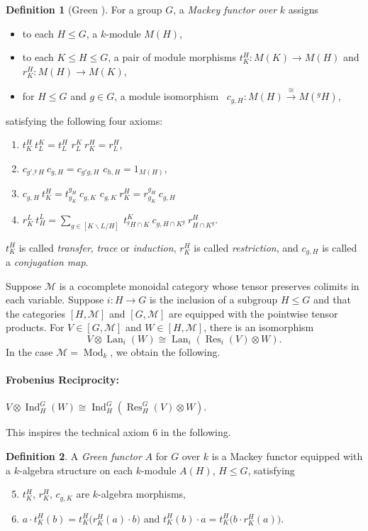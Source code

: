 \documentclass[a4paper,12pt]{article}
\theoremstyle{definition}
\newtheorem*{Definition}{Definition}%
\theoremstyle{fact}
\theoremstyle{genquest}
\theoremstyle{step}
\newcommand{\Ind}{\operatorname{Ind}}
\newcommand{\Lan}{\operatorname{Lan}}
\newcommand{\funcM}{\mathcal{M}}
\newcommand{\Mod}{\operatorname{Mod}}
\newcommand{\Res}{\operatorname{Res}}
\newcommand{\longto}{\longrightarrow}
\begin{document}
\begin{Definition}[Green \cite{Green1971}]
For a group $G$, a \emph{Mackey functor over} $k$ assigns
\begin{itemize}\addtolength{\itemsep}{-7pt}%
\item to each $H \leq G$, a $k$-module $M(H)$,
\item to each $K \leq H \leq G$, a pair of module morphisms
$
t^H_K : M(K) \to M(H)$ and $r^H_K : M(H) \to M(K)$,
%
\item 
for $H \leq G$ and $g\in G$, a module isomorphism \ 
$
c_{g,H} : M(H) \stackrel{\cong}{\longto} M (^g H)$,
%
\end{itemize}
satisfying the following four axioms: 
\begin{enumerate}[\upshape 1.]
\item
 $t^H_K \  t^K_L = t^H_L$  $r^K_L \  r^H_K = r^H_L$,
%
\item
$c_{g',^g H} \ c_{g,H} = c_{g'g,H}$  $c_{h,H} = 1_{M(H)}$,
%
\item
$c_{g,H} \  t^H_K = t^{g_H}_{g_K} \  c_{g,K}$  $c_{g,K} \  r^H_K = r^{g_H}_{g_K} \  c_{g,H}$
%
\item
 $r^L_K \  t^L_H =  \sum_{g\in[K\backslash L/H]} \  t^K_{{^{g}H\cap K}} \  c_{g,H\cap K^g} \  r^H_{H\cap K^g}$.
\end{enumerate}
$t^H_K$ is called \emph{transfer}, \emph{trace} or \emph{induction},
$r^H_K$ is called \emph{restriction}, and
$c_{g,H}$ is called a \emph{conjugation map}.
\end{Definition}

\noindent
Suppose $\funcM$ is a cocomplete monoidal category whose tensor preserves colimits in each variable.   Suppose $i : H \to G$ is the inclusion of a subgroup $H \leq G$ and that the categories $[H,\funcM]$ and $[G,\funcM]$ are equipped with the pointwise tensor products.    For $V \in [G, \funcM]$ and $W \in [H,\funcM]$, there is an isomorphism
\[
V \otimes \Lan_i (W) \cong \Lan_i (\Res_i (V) \otimes W).
\]
In the case $\funcM = \Mod _k$, we obtain the following.

\paragraph*{Frobenius Reciprocity:} \quad
$ V \otimes \Ind^G_H (W) \cong \Ind^G_H (\Res^G_H (V) \otimes W)$.

\medskip\noindent
This inspires the technical axiom 6 in the following.
 
\begin{Definition} 
A \emph{Green functor} $A$ for $G$ over $k$ is a Mackey functor equipped with a $k$-algebra structure on each $k$-module $A(H)$, $H \leq G$, satisfying
%
\begin{enumerate}[\upshape 1.]\setcounter{enumi}{4}
\item %
$t^H_K$, $r^H_K$, $c_{g,K}$ are $k$-algebra morphisms,
%
\item %
 $a \cdot t^H_K (b) = t^H_K \bigl(r^H_K (a) \cdot b\bigr)$ 
 and $t^H_K (b) \cdot a = t^H_K \bigl(b \cdot r^H_K (a)\bigr)$.
\end{enumerate}
\end{Definition} 
\end{document}
